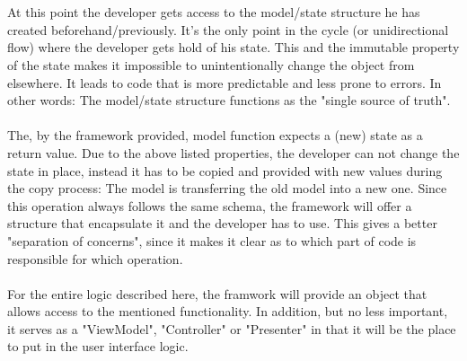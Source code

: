 \\
\\
At this point the developer gets access to the model/state structure he has created beforehand/previously. It's the only point in the cycle (or unidirectional flow) 
where the developer gets hold of his state. This and the immutable property of the state makes it impossible to unintentionally change the object from elsewhere. It leads 
to code that is more predictable and less prone to errors. In other words: The model/state structure functions as the "single source of truth".
\\
\\
The, by the framework provided, model function expects a (new) state as a return value. Due to the above listed properties, the developer can not change the state 
in place, instead it has to be copied and provided with new values during the copy process: The model is transferring the old model into a new one.
Since this operation always follows the same schema, the framework will offer a structure that encapsulate it and the developer has to use.
This gives a better "separation of concerns", since it makes it clear as to which part of code is responsible for which operation.
\\
\\
For the entire logic described here, the framwork will provide an object that allows access to the mentioned functionality. In addition, but no less important, 
it serves as a "ViewModel", "Controller" or "Presenter" in that it will be the place to put in the user interface logic.


